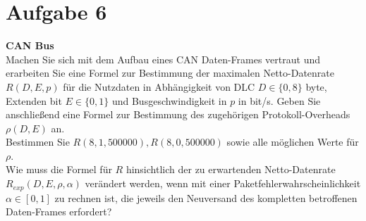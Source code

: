\documentclass[12pt,a4paper,ngerman]{article}
\begin{document}
\pagebreak

\section*{Aufgabe 6}


\begin{framed}
\textbf{CAN Bus}\\
Machen Sie sich mit dem Aufbau eines CAN Daten-Frames vertraut und erarbeiten Sie eine Formel zur Bestimmung der maximalen Netto-Datenrate $R(D,E,p)$ für die Nutzdaten in Abhängigkeit von DLC $D \in \{0,8\}$ byte, Extenden bit $E \in \{0,1\}$ und Busgeschwindigkeit in $p$ in bit/s. Geben Sie anschließend eine Formel zur Bestimmung des zugehörigen Protokoll-Overheads $\rho (D,E)$ an. \\
Bestimmen Sie $R(8,1,500000),R(8,0,500000)$ sowie alle möglichen Werte für $\rho$. \\
Wie muss die Formel für $R$ hinsichtlich der zu erwartenden Netto-Datenrate $R_{exp}(D,E,\rho, \alpha)$ verändert werden, wenn mit einer Paketfehlerwahrscheinlichkeit $\alpha \in [0,1]$ zu rechnen ist, die jeweils den Neuversand des kompletten betroffenen Daten-Frames erfordert? 
\end{framed}



   
   
\end{document}
